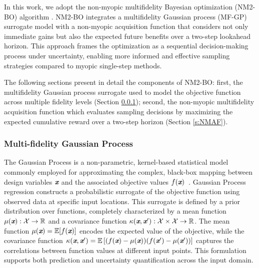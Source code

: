 In this work, we adopt the non-myopic multifidelity Bayesian optimization (NM2-BO) algorithm \cite{DiFioreMaininiNM2BO}. NM2-BO integrates a multifidelity Gaussian process (MF-GP) surrogate model with a non-myopic acquisition function that considers not only immediate gains but also the expected future benefits over a two-step lookahead horizon. This approach frames the optimization as a sequential decision-making process under uncertainty, enabling more informed and effective sampling strategies compared to myopic single-step methods.

The following sections present in detail the components of NM2-BO: first, the multifidelity Gaussian process surrogate used to model the objective function across multiple fidelity levels (Section \ref{s:MFGP}); second, the non-myopic multifidelity acquisition function which evaluates sampling decisions by maximizing the expected cumulative reward over a two-step horizon (Section \ref{s:NMAF}).

\subsubsection{Multi-fidelity Gaussian Process}
\label{s:MFGP}

The Gaussian Process is a non-parametric, kernel-based statistical model commonly employed for approximating the complex, black-box mapping between design variables $\textbf{\em x}$ and the associated objective values $f(\textbf{\em x})$~\cite{williams1995gaussian, schulz2018tutorial}. Gaussian Process regression constructs a probabilistic surrogate of the objective function using observed data at specific input locations. This surrogate is defined by a prior distribution over functions, completely characterized by a mean function $\mu(\textbf{\em x}) : \mathcal{X} \rightarrow \mathbb{R}$ and a covariance function $\kappa(\textbf{\em x}, \textbf{\em x}') : \mathcal{X} \times \mathcal{X} \rightarrow \mathbb{R}$. The mean function $\mu(\textbf{\em x}) = \mathbb{E}[f(\textbf{\em x})]$ encodes the expected value of the objective, while the covariance function $\kappa(\textbf{\em x}, \textbf{\em x}') = \mathbb{E} \left[ (f(\textbf{\em x})-\mu(\textbf{\em x}))(f(\textbf{\em x}')-\mu(\textbf{\em x}')) \right]$ captures the correlations between function values at different input points. This formulation supports both prediction and uncertainty quantification across the input domain.

